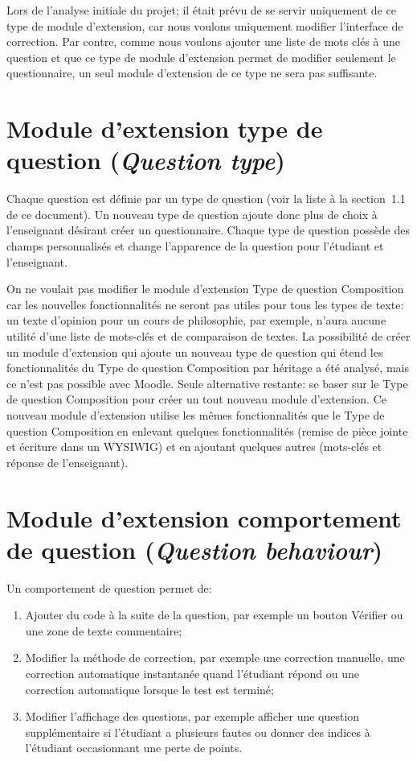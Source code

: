 Lors de l'analyse initiale du projet; il était prévu de se servir uniquement de ce type de module d'extension, car nous voulons uniquement modifier l'interface de correction.
Par contre, comme nous voulons ajouter une liste de mots clés à une question et que ce type de module d'extension permet de modifier seulement le questionnaire, un seul module d'extension de ce type ne sera pas suffisante.

\section{Module d'extension type de question (\textit{Question type})}

Chaque question est définie par un type de question (voir la liste à la section~1.1 de ce document).
Un nouveau type de question ajoute donc plus de choix à l'enseignant désirant créer un questionnaire.
Chaque type de question possède des champs personnalisés et change l'apparence de la question pour l'étudiant et l'enseignant.

On ne voulait pas modifier le module d'extension \og Type de question Composition \fg{} car les nouvelles fonctionnalités ne seront pas utiles pour tous les types de texte: un texte d'opinion pour un cours de philosophie, par exemple, n'aura aucune utilité d'une liste de mots-clés et de comparaison de textes.
La possibilité de créer un module d'extension qui ajoute un nouveau type de question qui étend les fonctionnalités du \og Type de question Composition \fg{} par héritage a été analysé, mais ce n'est pas possible avec Moodle.
Seule alternative restante: se baser sur le \og Type de question Composition \fg{} pour créer un tout nouveau module d'extension.
Ce nouveau module d'extension utilise les mêmes fonctionnalités que le \og Type de question Composition \fg{} en enlevant quelques fonctionnalités (remise de pièce jointe et écriture dans un WYSIWIG) et en ajoutant quelques autres (mots-clés et réponse de l'enseignant).

\section{Module d'extension comportement de question (\textit{Question behaviour})}

Un comportement de question permet de:
\begin{enumerate}
  \item Ajouter du code à la suite de la question, par exemple un bouton \og Vérifier \fg{} ou une zone de texte commentaire;
  
  \item Modifier la méthode de correction, par exemple une correction manuelle, une correction automatique instantanée quand l'étudiant répond ou une correction automatique lorsque le test est terminé;
  
  \item Modifier l'affichage des questions, par exemple afficher une question supplémentaire si l'étudiant a plusieurs fautes ou donner des indices à l'étudiant occasionnant une perte de points.
\end{enumerate}

